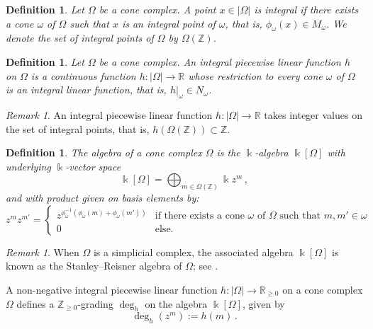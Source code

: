 \documentclass[12pt,letterpaper, reqno]{amsart}
\theoremstyle{defstyle} \newtheorem{definition}[theorem]{Definition}
\theoremstyle{remark}
\newtheorem{remark}[theorem]{Remark}
\numberwithin{equation}{section}
\numberwithin{figure}{section}
\newcommand{\kk} {\Bbbk}
\newcommand{\RR} {\mathbb{R}}
\newcommand{\ZZ} {\mathbb{Z}}
\begin{document}
\begin{definition}
    Let $\Omega$ be a cone complex. A point $x \in 
    |\Omega|$ is \emph{integral} if there exists a cone $\omega$ of $\Omega$ such that $x$ is an integral point of $\omega$, that is,  $\phi_\omega(x) \in M_\omega$. 
    We denote the set of integral points of $\Omega$ by $\Omega(\ZZ)$.
\end{definition}


\begin{definition}
Let $\Omega$ be a cone complex. An integral piecewise linear function $h$ on $\Omega$ is a continuous function $h: |\Omega| \rightarrow \RR$ whose restriction to every cone $\omega$ of $\Omega$
 is an integral linear function, that is, $h|_\omega \in N_\omega$.
\end{definition}

\begin{remark}
    An integral piecewise linear function $h: |\Omega| \rightarrow \RR$ takes integer values on the set of integral points, that is,  $h(\Omega(\ZZ)) \subset \ZZ$. 
\end{remark}




\begin{definition} \label{def_algebra_cone}
The \emph{algebra of a cone complex $\Omega$} is the $\kk$-algebra $\kk[\Omega]$ with underlying $\kk$-vector space 
\[ \kk[\Omega]= \bigoplus_{m \in \Omega(\ZZ)} \kk z^m \,, \]
and with product given on basis elements by:
\[ z^m z^{m'}=\begin{cases}
    z^{\phi_\omega^{-1}(\phi_\omega(m)+\phi_\omega(m'))} & \text{if there exists a cone } \omega \text{ of }\Omega\text{ such that }m,m' \in \omega \\
    0 & \text{else.}
\end{cases}\]
\end{definition}

\begin{remark}
When $\Omega$ is a simplicial complex, the associated algebra $\kk[\Omega]$ is known as the Stanley--Reisner algebra of $\Omega$; see \cite[Chapter II]{stanley_book}.
\end{remark}

A non-negative integral piecewise linear function $h: |\Omega| \rightarrow \RR_{\geq 0}$ on a cone complex $\Omega$ defines a $\ZZ_{\geq 0}$-grading $\deg_h$ on the algebra $\kk[\Omega]$, given by
\[ \deg_h(z^m):= h(m) \,.\]
\end{document}
